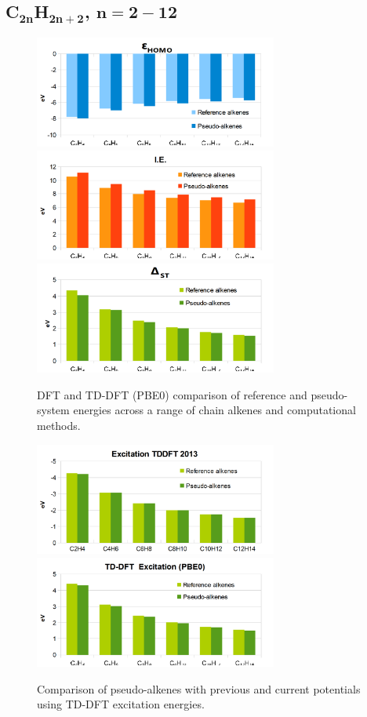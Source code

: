 \documentclass[journal=jctcce,manuscript=article]{achemso}
\begin{document}
\subsection{C\(\mathbf{_{2n}}\)H\(\mathbf{_{2n+2}}\), \(\mathbf{n=2-12}\)}

\begin{figure}[h]
\includegraphics[width=8cm]{pbe0_homo}
\includegraphics[width=8cm]{pbe0_ionisation}
\includegraphics[width=8cm]{pbe0_excitation}
\caption{DFT and TD-DFT (PBE0) comparison of reference and pseudo-system energies across a range of chain alkenes and computational methods.}
\label{fig:alkenes_hf_dft}
\end{figure}
\begin{figure}[h]
\includegraphics[width=8cm]{tddft_excitation_cd}
\includegraphics[width=8cm]{tddft_excitation}
\caption{Comparison of pseudo-alkenes with previous\cite{drujon_pseudopotentials_2013} and current potentials using TD-DFT excitation energies.}
\label{fig:alkenes_tddft}
\end{figure}
\end{document}

